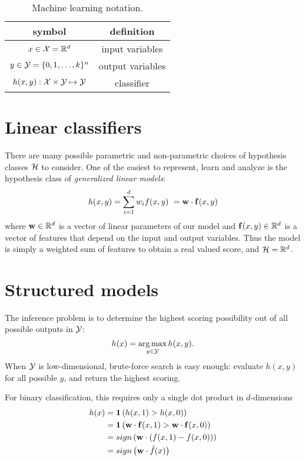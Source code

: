 \begin{table}[tb!]
\centering
\begin{tabular}{| c | c | }
\hline
symbol & definition \\
\hline
\hline
$x \in \mathcal{X} = \mathbb{R}^d$ & input variables\\
$y \in \mathcal{Y} =\{0,1,\ldots,k\}^n$ & output variables \\
$h(x,y): \mathcal{X} \times \mathcal{Y} \mapsto \mathcal{Y}$ & classifier \\
\hline
\end{tabular}
\caption[Machine learning notation]{Machine learning notation.}
\label{tab:notation}
\end{table}



\section{Linear classifiers}
There are many possible parametric and non-parametric choices of hypothesis 
classes $\mathcal{H}$ to consider.  One of the easiest to represent, learn and analyze 
is the hypothesis class of {\em generalized linear models}:
\begin{equation}
h(x,y) = \sum_{i=1}^d w_i f(x,y)\ = \mathbf{w} \cdot \mathbf{f}(x,y) 
\end{equation}
where $\mathbf{w} \in \mathbb{R}^d$ is a vector of linear parameters of our model and 
$\mathbf{f}(x,y) \in \mathbb{R}^d$ is a vector of features that depend on the input and 
output variables.  Thus the model is simply a weighted sum of features to 
obtain a real valued score, and $\mathcal{H} = \mathbb{R}^d$.


\section{Structured models}

The inference problem is to determine the highest scoring possibility out of 
all possible outputs in $\mathcal{Y}$: \begin{equation} h(x) = \mathop{\arg\max}_{y \in \mathcal{Y}} 
h(x,y).  \end{equation}  When $\mathcal{Y}$ is low-dimensional, brute-force search is 
easy enough: evaluate $h(x,y)$ for all possible $y$, and return the highest 
scoring.

For binary classification, this requires only a single dot product in $d$-dimensions
\begin{align}
h(x) &= \mathbf{1}\left( h(x,1) > h(x,0)\right) \\
&= \mathbf{1}\left( \mathbf{w} \cdot \mathbf{f}(x,1) > \mathbf{w} \cdot \mathbf{f}(x,0) \right) \\
&= sign\left( \mathbf{w} \cdot \left(f(x,1) - f(x,0)\right) \right) \\ 
&= sign\left( \mathbf{w} \cdot \tilde{f}(x) \right)  
\end{align}

